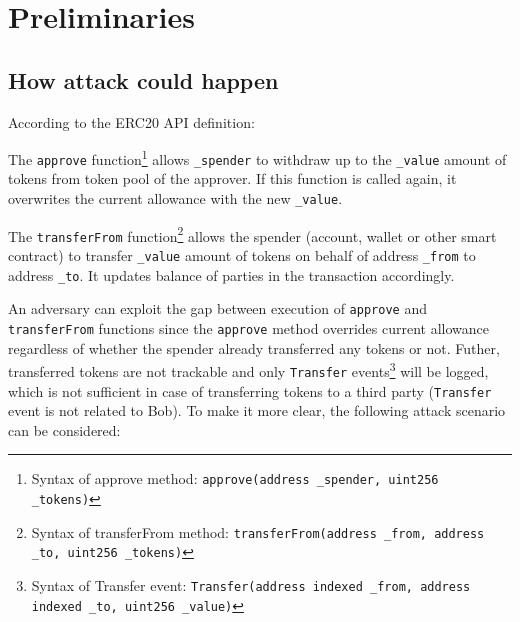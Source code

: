 
\section{Preliminaries}

\subsection{How attack could happen}

According to the ERC20 API definition:

\begin{compactlist}
\item The \texttt{approve} function\footnote{Syntax of approve method: \texttt{approve(address \texttt{\_spender}, uint256 \texttt{\_tokens})}} allows \texttt{\_spender} to withdraw up to the \texttt{\_value} amount of tokens from token pool of the approver. If this function is called again, it overwrites the current allowance with the new \texttt{\_value}.
\item The \texttt{transferFrom} function\footnote{Syntax of transferFrom method: \texttt{transferFrom(address \texttt{\_from}, address \texttt{\_to}, uint256 \texttt{\_tokens})}} allows the spender (\eg account, wallet or other smart contract) to transfer \texttt{\_value} amount of tokens on behalf of address \texttt{\_from} to address \texttt{\_to}. It updates balance of parties in the transaction accordingly. 
\end{compactlist}

An adversary can exploit the gap between execution of \texttt{approve} and \texttt{transferFrom} functions since the \texttt{approve} method overrides current allowance regardless of whether the spender already transferred any tokens or not. Futher, transferred tokens are not trackable and only \texttt{Transfer} events\footnote{Syntax of Transfer event: \texttt{Transfer(address indexed \texttt{\_from}, address indexed \texttt{\_to}, uint256 \texttt{\_value})}} will be logged, which is not sufficient in case of transferring tokens to a third party (\texttt{Transfer} event is not related to Bob). To make it more clear, the following attack scenario can be considered:


